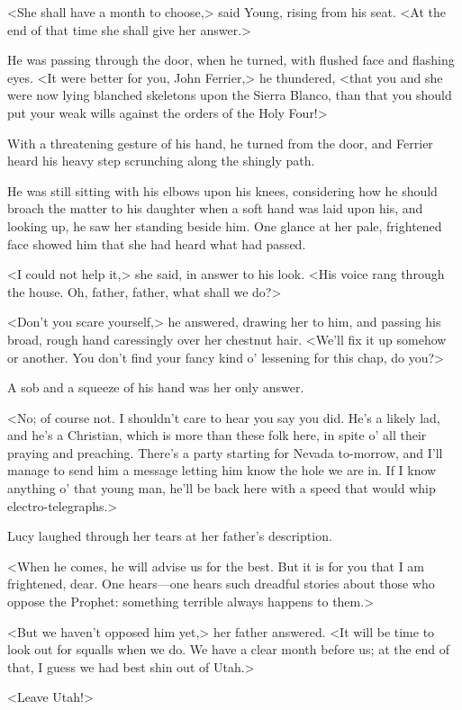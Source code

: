 <She shall have a month to choose,> said Young, rising from his seat. <At the end of that time she shall give her answer.>

He was passing through the door, when he turned, with flushed face and flashing eyes. <It were better for you, John Ferrier,> he thundered, <that you and she were now lying blanched skeletons upon the Sierra Blanco, than that you should put your weak wills against the orders of the Holy Four!>

With a threatening gesture of his hand, he turned from the door, and Ferrier heard his heavy step scrunching along the shingly path.

He was still sitting with his elbows upon his knees, considering how he should broach the matter to his daughter when a soft hand was laid upon his, and looking up, he saw her standing beside him. One glance at her pale, frightened face showed him that she had heard what had passed.

<I could not help it,> she said, in answer to his look. <His voice rang through the house. Oh, father, father, what shall we do?>

<Don't you scare yourself,> he answered, drawing her to him, and passing his broad, rough hand caressingly over her chestnut hair. <We'll fix it up somehow or another. You don't find your fancy kind o' lessening for this chap, do you?>

A sob and a squeeze of his hand was her only answer.

<No; of course not. I shouldn't care to hear you say you did. He's a likely lad, and he's a Christian, which is more than these folk here, in spite o' all their praying and preaching. There's a party starting for Nevada to-morrow, and I'll manage to send him a message letting him know the hole we are in. If I know anything o' that young man, he'll be back here with a speed that would whip electro-telegraphs.>

Lucy laughed through her tears at her father's description.

<When he comes, he will advise us for the best. But it is for you that I am frightened, dear. One hears—one hears such dreadful stories about those who oppose the Prophet: something terrible always happens to them.>

<But we haven't opposed him yet,> her father answered. <It will be time to look out for squalls when we do. We have a clear month before us; at the end of that, I guess we had best shin out of Utah.>

<Leave Utah!>


